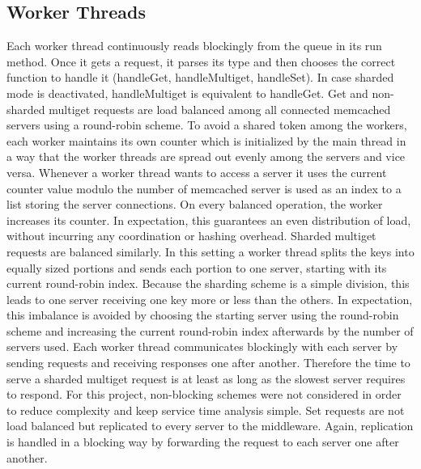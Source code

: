\documentclass[11pt,a4paper]{article}
\begin{document}
\subsection{Worker Threads}
Each worker thread continuously reads blockingly from the queue in its run method.
Once it gets a request, it parses its type and then chooses the correct function to handle it (handleGet, handleMultiget, handleSet).
In case sharded mode is deactivated, handleMultiget is equivalent to handleGet.
Get and non-sharded multiget requests are load balanced among all connected memcached servers using a round-robin scheme.
To avoid a shared token among the workers, each worker maintains its own counter which is initialized by the main thread in a way that the worker threads are spread out evenly among the servers and vice versa.
Whenever a worker thread wants to access a server it uses the current counter value modulo the number of memcached server is used as an index to a list storing the server connections.
On every balanced operation, the worker increases its counter.
In expectation, this guarantees an even distribution of load, without incurring any coordination or hashing overhead.
Sharded multiget requests are balanced similarly. In this setting a worker thread splits the keys into equally sized portions and sends each portion to one server, starting with its current round-robin index.
Because the sharding scheme is a simple division, this leads to one server receiving one key more or less than the others.
In expectation, this imbalance is avoided by choosing the starting server using the round-robin scheme and increasing the current round-robin index afterwards by the number of servers used.
Each worker thread communicates blockingly with each server by sending requests and receiving responses one after another.
Therefore the time to serve a sharded multiget request is at least as long as the slowest server requires to respond.
For this project, non-blocking schemes were not considered in order to reduce complexity and keep service time analysis simple.
Set requests are not load balanced but replicated to every server to the middleware.
Again, replication is handled in a blocking way by forwarding the request to each server one after another.
\end{document}

